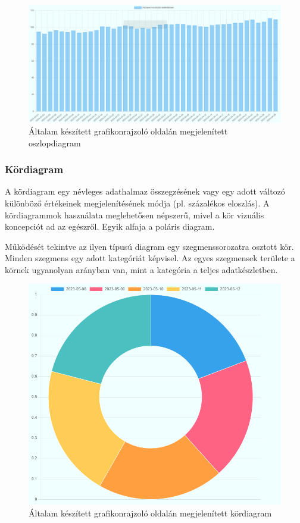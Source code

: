 \clearpage

\begin{figure}[h]
\centering
\includegraphics[scale=0.3]{images/barChartExample}
\caption{Általam készített grafikonrajzoló oldalán megjelenített oszlopdiagram}
\end{figure}

\subsubsection{Kördiagram}

A kördiagram egy névleges adathalmaz összegzésének vagy egy adott változó különböző értékeinek megjelenítésének módja (pl. százalékos eloszlás). A kördiagrammok használata meglehetősen népszerű, mivel a kör vizuális koncepciót ad az egészről. Egyik alfaja a poláris diagram.

	Működését tekintve az ilyen típusú diagram egy szegmenssorozatra osztott kör. Minden szegmens egy adott kategóriát képvisel. Az egyes szegmensek területe a körnek ugyanolyan arányban van, mint a kategória a teljes adatkészletben.

\begin{figure}[h]
\centering
\includegraphics[scale=0.4]{images/pieChartExample}
\caption{Általam készített grafikonrajzoló oldalán megjelenített kördiagram}
\end{figure}

